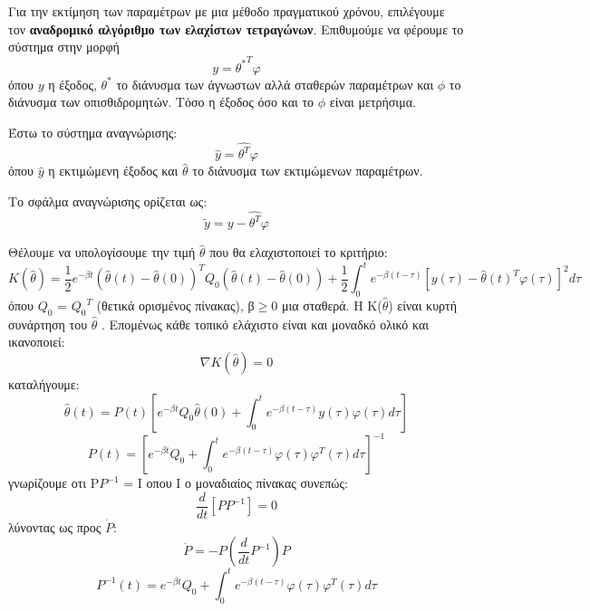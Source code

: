 \documentclass{article}
\begin{document}
Για την εκτίμηση των παραμέτρων με μια μέθοδο πραγματικού χρόνου, επιλέγουμε τον \textbf{αναδρομικό αλγόριθμο των ελαχίστων τετραγώνων}. Επιθυμούμε να φέρουμε το σύστημα στην μορφή
\begin{equation*}
y = {θ^*}^Tφ
\end{equation*}
όπου $y$ η έξοδος, ${θ^*}$ το διάνυσμα των άγνωστων αλλά σταθερών παραμέτρων και $\phi$ το διάνυσμα των οπισθιδρομητών. Τόσο η έξοδος όσο και το $\phi$ είναι μετρήσιμα. \par Έστω το σύστημα αναγνώρισης:
\begin{equation*}
\hat{y} = \hat{{θ}^T}φ 
\end{equation*}
όπου $\hat{y}$ η εκτιμώμενη έξοδος και $\hat{θ}$ το διάνυσμα των εκτιμώμενων παραμέτρων.
\par Το σφάλμα αναγνώρισης ορίζεται ως:
\begin{equation*}
\tilde{y} = y - \hat{{θ}^T}φ 
\end{equation*}
\par Θέλουμε να υπολογίσουμε την τιμή $\hat{θ}$ που θα ελαχιστοποιεί το κριτήριο:
\begin{equation*}
K(\hat{θ}) = \frac{1}{2}e^{-βt}(\hat{θ}(t) - \hat{θ}(0))^T Q_0 (\hat{θ}(t) - \hat{θ}(0)) + \frac{1}{2} \int_{0}^{t} e^{-β(t-τ)}[y(τ) - \hat{θ}(t)^Tφ(τ)]^2 dτ
\end{equation*}
όπου $Q_0$ = ${Q_0}^T$ (θετικά ορισμένος πίνακας), β$\geq$0 μια σταθερά. Η Κ($\hat{θ}$) είναι κυρτή συνάρτηση του $\hat{θ}$ . Επομένως κάθε τοπικό ελάχιστο είναι και μοναδκό ολικό και ικανοποιεί:
\begin{equation*}
\nabla{K(\hat{θ})} = 0
\end{equation*}
καταλήγουμε:
\begin{equation*}
\hat{θ}(t) = P(t) [ e^{-βt} Q_0 \hat{θ}(0) + \int_{0}^{t} e^{-β(t-τ)}y(τ)φ(τ) dτ]
\end{equation*}
\begin{equation*}
P(t) = [ e^{-βt} Q_0 + \int_{0}^{t} e^{-β(t-τ)}φ(τ)φ^T(τ) dτ]^{-1}
\end{equation*}
γνωρίζουμε οτι Ρ$P^{-1}$ = Ι οπου Ι ο μοναδιαίος πίνακας συνεπώς:
\begin{equation*}
\frac{d}{dt}[PP^{-1}] = 0
\end{equation*}
λύνοντας ως προς $\dot{P}$:
\begin{equation*}
\dot{P} = -P(\frac{d}{dt}P^{-1})P
\end{equation*}
\begin{equation*}
P^{-1}(t) = e^{-βt} Q_0 + \int_{0}^{t} e^{-β(t-τ)}φ(τ)φ^T(τ) dτ
\end{equation*}
\end{document}
